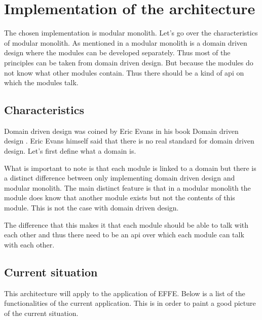 \chapter{Implementation of the architecture}

The chosen implementation is modular monolith. Let’s go over the characteristics of modular monolith. As mentioned in  a modular monolith is a domain driven design where the modules can be developed separately. Thus most of the principles can be taken from domain driven design. But because the modules do not know what other modules contain. Thus there should be a kind of api on which the modules talk.

\section{Characteristics}

Domain driven design was coined by Eric Evans in his book Domain driven design \cite{domainDrivenDesign}. Eric Evans himself said that there is no real standard for domain driven design. Let’s first define what a domain is.


What is important to note is that each module is linked to a domain but there is a distinct difference between only implementing domain driven design and modular monolith. The main distinct feature is that in a modular monolith the module does know that another module exists but not the contents of this module. This is not the case with domain driven design.

The difference that this makes it that each module should be able to talk with each other and thus there need to be an api over which each module can talk with each other.

\section{Current situation}

This architecture will apply to the application of EFFE. Below is a list of the functionalities of the current application. This is in order to paint a good picture of the current situation.

